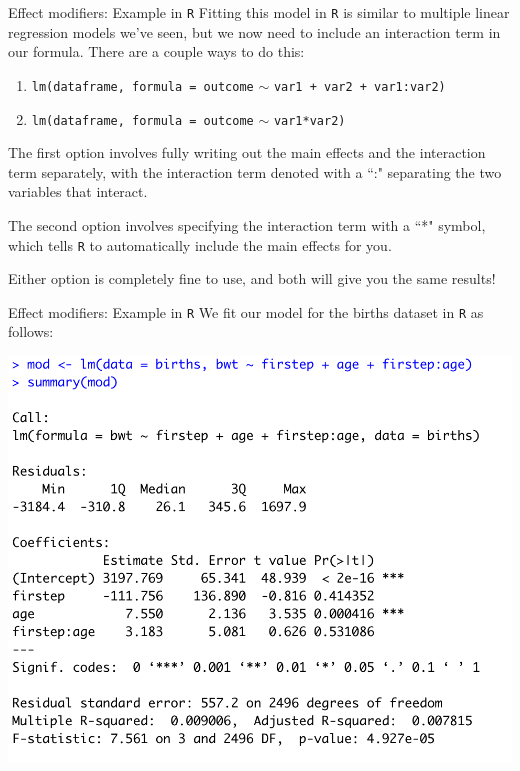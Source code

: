 \documentclass[10pt,t]{beamer}
\begin{document}
\begin{frame}{Effect modifiers: Example in \texttt{R}}
\vspace{-0.4cm}
Fitting this model in \texttt{R} is similar to multiple linear regression models we've seen, but we now need to include an interaction term in our formula. There are a couple ways to do this:

\vspace{0.3cm}

\begin{enumerate}
	\item \texttt{lm(dataframe, formula = outcome} $\sim$ \texttt{var1 + var2 + var1:var2)}
	\item \texttt{lm(dataframe, formula = outcome} $\sim$ \texttt{var1*var2)}
\end{enumerate}

\vspace{0.3cm}

The first option involves fully writing out the main effects and the interaction term separately, with the interaction term denoted with a ``:" separating the two variables that interact.

\vspace{0.3cm}

The second option involves specifying the interaction term with a ``*" symbol, which tells \texttt{R} to automatically include the main effects for you.

\vspace{0.3cm}

Either option is completely fine to use, and both will give you the same results!

\end{frame}

\begin{frame}{Effect modifiers: Example in \texttt{R}}
We fit our model for the births dataset in \texttt{R} as follows:

\vspace{0.3cm}

\centering \includegraphics[scale=0.4]{interact_mod.png}
\end{frame}
\end{document}
